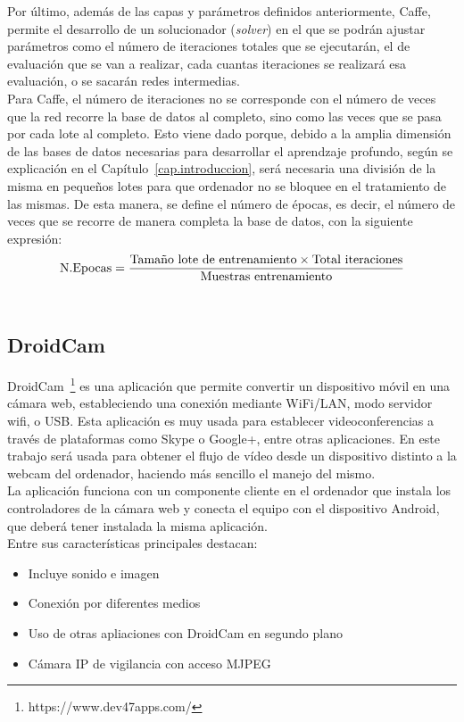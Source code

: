 Por último, además de las capas y parámetros definidos anteriormente, Caffe, permite el desarrollo de un solucionador (\textit{solver}) en el que se podrán ajustar parámetros como el número de iteraciones totales que se ejecutarán, el de evaluación que se van a realizar, cada cuantas iteraciones se realizará esa evaluación, o se sacarán redes intermedias.\\

Para Caffe, el número de iteraciones no se corresponde con el número de veces que la red recorre la base de datos al completo, sino como las veces que se pasa por cada lote al completo. Esto viene dado porque, debido a la amplia dimensión de las bases de datos necesarias para desarrollar el aprendzaje profundo, según se explicación en el Capítulo~\ref{cap.introduccion}, será necesaria una división de la misma en pequeños lotes para que ordenador no se bloquee en el tratamiento de las mismas. De esta manera, se define el número de épocas, es decir, el número de veces que se recorre de manera completa la base de datos, con la siguiente expresión:\\
$$\textup{N.Epocas}=\frac{\textup{Tamaño lote de entrenamiento}\times \textup{Total iteraciones}}{\textup{Muestras entrenamiento}} $$\\

\subsection{DroidCam}\label{sec.droid}
DroidCam~\footnote{https://www.dev47apps.com/} es una aplicación que permite convertir un dispositivo móvil en una cámara web, estableciendo una conexión mediante WiFi/LAN, modo servidor wifi, o USB. Esta aplicación es muy usada para establecer videoconferencias a través de plataformas como Skype o Google+, entre otras aplicaciones. En este trabajo será usada para obtener el flujo de vídeo desde un dispositivo distinto a la webcam del ordenador, haciendo más sencillo el manejo del mismo.\\

La aplicación funciona con un componente cliente en el ordenador que instala los controladores de la cámara web y conecta el equipo con el dispositivo Android, que deberá tener instalada la misma aplicación.\\

Entre sus características principales destacan:
	\begin{itemize}
		\item Incluye sonido e imagen
		\item Conexión por diferentes medios
		\item Uso de otras apliaciones con DroidCam en segundo plano
		\item Cámara IP de vigilancia con acceso MJPEG
	\end{itemize}

